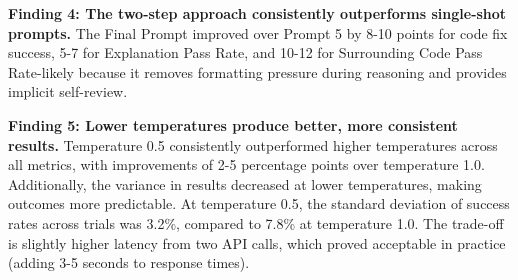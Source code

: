 \documentclass[conference]{IEEEtran}
\begin{document}

\textbf{Finding 4: The two-step approach consistently outperforms single-shot prompts.} The Final Prompt improved over Prompt 5 by 8-10 points for code fix success, 5-7 for Explanation Pass Rate, and 10-12 for Surrounding Code Pass Rate-likely because it removes formatting pressure during reasoning and provides implicit self-review.

\textbf{Finding 5: Lower temperatures produce better, more consistent results.} Temperature 0.5 consistently outperformed higher temperatures across all metrics, with improvements of 2-5 percentage points over temperature 1.0. Additionally, the variance in results decreased at lower temperatures, making outcomes more predictable. At temperature 0.5, the standard deviation of success rates across trials was 3.2\%, compared to 7.8\% at temperature 1.0. The trade-off is slightly higher latency from two API calls, which proved acceptable in practice (adding 3-5 seconds to response times).

\end{document}
